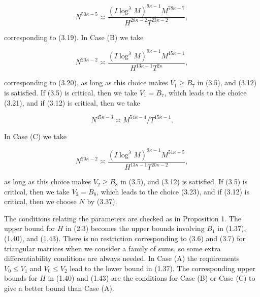 \documentclass[10pt]{article}
\begin{document}
\begin{equation*}
N^{50 \kappa-5} \asymp \frac{\left(I \log ^{\lambda} M\right)^{9 \kappa-1} M^{78 \kappa-7}}{H^{28 \kappa-2} T^{23 \kappa-2}}, \tag{3.35}
\end{equation*}


corresponding to (3.19). In Case (B) we take


\begin{equation*}
N^{20 \kappa-2} \asymp \frac{\left(I \log ^{\lambda} M\right)^{9 \kappa-1} M^{15 \kappa-1}}{H^{13 \kappa-1} T^{2 \kappa}}, \tag{3.36}
\end{equation*}


corresponding to (3.20), as long as this choice makes $V_{1} \geqslant B_{7}$ in (3.5), and (3.12) is satisfied. If (3.5) is critical, then we take $V_{1}=B_{7}$, which leads to the choice (3.21), and if (3.12) is critical, then we take


\begin{equation*}
N^{45 \kappa-3} \asymp M^{54 \kappa-4} / T^{15 \kappa-1}. \tag{3.37}
\end{equation*}


In Case (C) we take


\begin{equation*}
N^{20 \kappa-2} \asymp \frac{\left(I \log ^{\lambda} M\right)^{9 \kappa-1} M^{51 \kappa-5}}{H^{13 \kappa-1} T^{20 \kappa-2}}, \tag{3.38}
\end{equation*}


as long as this choice makes $V_{2} \geqslant B_{8}$ in (3.5), and (3.12) is satisfied. If (3.5) is critical, then we take $V_{2}=B_{8}$, which leads to the choice (3.23), and if (3.12) is critical, then we choose $N$ by (3.37).

The conditions relating the parameters are checked as in Proposition 1. The upper bound for $H$ in (2.3) becomes the upper bounds involving $B_{1}$ in (1.37), (1.40), and (1.43). There is no restriction corresponding to (3.6) and (3.7) for triangular matrices when we consider a family of sums, so some extra differentiability conditions are always needed. In Case (A) the requirements $V_{0} \leqslant V_{1}$ and $V_{0} \leqslant V_{2}$ lead to the lower bound in (1.37). The corresponding upper bounds for $H$ in (1.40) and (1.43) are the conditions for Case (B) or Case (C) to give a better bound than Case (A).
\end{document}
